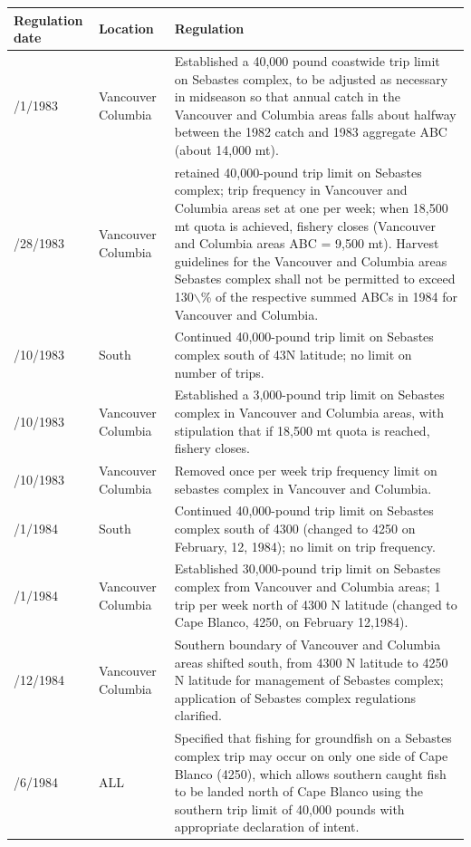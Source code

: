 \documentclass[12pt,]{article}
\begin{document}
\begin{tabular}{>{\centering}p{.60in}>{\centering}p{1.0in}>{\raggedright}p{4.20in}}
  \hline
Regulation date & Location & Regulation \\ 
  \hline
1/1/1983 & Vancouver Columbia & Established a 40,000 pound coastwide trip limit on Sebastes complex, to be adjusted as necessary in midseason so that annual catch in the Vancouver and Columbia areas falls about halfway between the 1982 catch and 1983 aggregate ABC (about 14,000 mt). \\ 
  6/28/1983 & Vancouver Columbia & retained 40,000-pound trip limit on Sebastes complex; trip frequency in Vancouver and Columbia areas set at one per week; when 18,500 mt quota is achieved, fishery closes (Vancouver and Columbia areas ABC = 9,500 mt). Harvest guidelines for the Vancouver and Columbia areas Sebastes complex shall not be permitted to exceed 130$\backslash$\% of the respective summed ABCs in 1984 for Vancouver and Columbia. \\ 
  9/10/1983 & 4300 South & Continued 40,000-pound trip limit on Sebastes complex south of 43N latitude; no limit on number of trips.  \\ 
  9/10/1983 & Vancouver Columbia & Established a 3,000-pound trip limit on Sebastes complex in Vancouver and Columbia areas, with stipulation that if 18,500 mt quota is reached, fishery closes.  \\ 
  9/10/1983 & Vancouver Columbia & Removed once per week trip frequency limit on sebastes complex in Vancouver and Columbia. \\ 
  1/1/1984 & 4300 South & Continued 40,000-pound trip limit on Sebastes complex south of 4300 (changed to 4250 on February, 12, 1984); no limit on trip frequency. \\ 
  1/1/1984 & Vancouver Columbia & Established 30,000-pound trip limit on Sebastes complex from Vancouver and Columbia areas; 1 trip per week north of 4300 N latitude (changed to Cape Blanco, 4250, on February 12,1984). \\ 
  2/12/1984 & Vancouver Columbia & Southern boundary of Vancouver and Columbia areas shifted south, from 4300 N latitude to 4250 N latitude for management of Sebastes complex; application of Sebastes complex regulations clarified.  \\ 
  5/6/1984 & ALL & Specified that fishing for groundfish on a Sebastes complex trip may occur on only one side of Cape Blanco (4250), which allows southern caught fish to be landed north of Cape Blanco using the southern trip limit of 40,000 pounds with appropriate declaration of intent. \\ 

\end{tabular}
\end{document}
